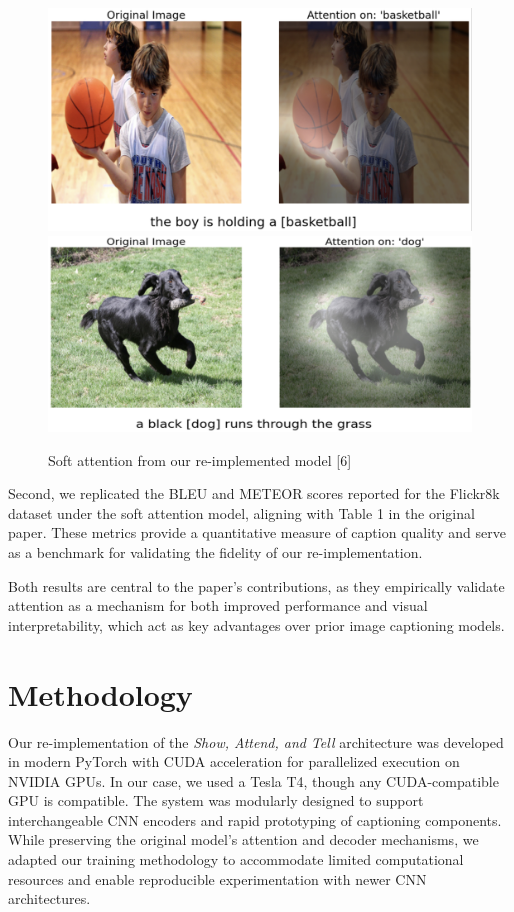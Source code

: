 \documentclass{article}
\begin{document}
\begin{figure}[h]
    \centering
    \includegraphics[width=0.35\linewidth]{example-boy.png}
    \includegraphics[width=0.4\linewidth]{example-dog.png}
    \caption{Soft attention from our re-implemented model [6]}
    \label{fig:results}
\end{figure}
Second, we replicated the BLEU and METEOR scores reported for the Flickr8k dataset under the soft attention model, aligning with Table 1 in the original paper. These metrics provide a quantitative measure of caption quality and serve as a benchmark for validating the fidelity of our re-implementation. 

Both results are central to the paper’s contributions, as they empirically validate attention as a mechanism for both improved performance and visual interpretability, which act as key advantages over prior image captioning models.

\section{Methodology}

Our re-implementation of the \textit{Show, Attend, and Tell} architecture was developed in modern PyTorch with CUDA acceleration for parallelized execution on NVIDIA GPUs. In our case, we used a Tesla T4, though any CUDA-compatible GPU is compatible. The system was modularly designed to support interchangeable CNN encoders and rapid prototyping of captioning components. While preserving the original model’s attention and decoder mechanisms, we adapted our training methodology to accommodate limited computational resources and enable reproducible experimentation with newer CNN architectures.
\end{document}
